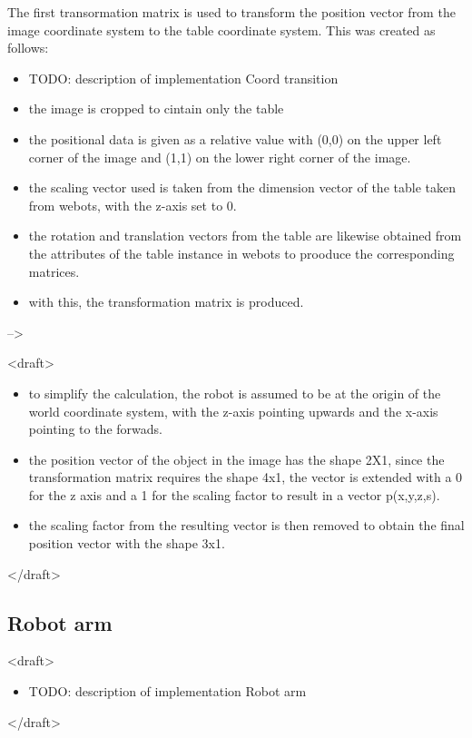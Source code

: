 The first transormation matrix is used to transform the position vector from the image coordinate system to the table coordinate system. This was created as follows:

\begin{itemize}
    \item TODO: description of implementation Coord transition
      
    \item the image is cropped to cintain only the table
    \item the positional data is given as a relative value with (0,0) on the upper left corner of the image and (1,1) on the lower right corner of the image.
      
    
    
    \item the scaling vector used is taken from the dimension vector of the table taken from webots, with the z-axis set to 0.
    \item the rotation and translation vectors from the table are likewise obtained from the attributes of the table instance in webots to prooduce the corresponding matrices.
    \item with this, the transformation matrix is produced. 
\end{itemize}

-->


<draft>
\begin{itemize}
    \item to simplify the calculation, the robot is assumed to be at the origin of the world coordinate system, with the z-axis pointing upwards and the x-axis pointing to the forwads.  
    \item the position vector of the object in the image has the shape 2X1, since the transformation matrix requires the shape 4x1, the vector is extended with a 0 for the z axis and a 1 for the scaling factor to result in a vector p(x,y,z,s).  
    \item the scaling factor from the resulting vector is then removed to obtain the final position vector with the shape 3x1.  
\end{itemize}
  
</draft>

\subsection{Robot arm}

<draft>
\begin{itemize}
    \item TODO: description of implementation Robot arm
\end{itemize}
</draft>

